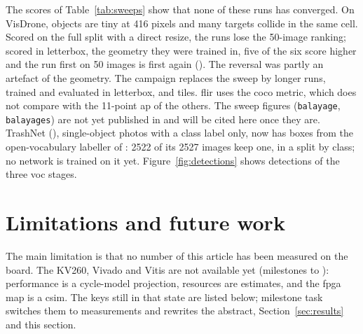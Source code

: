 \documentclass[11pt,a4paper]{article}
\begin{document}
The scores of Table~\ref{tab:sweeps} show that none of these runs has converged. On
VisDrone, objects are tiny at 416 pixels and many targets collide in the same cell. Scored
on the full split with a direct resize, the runs lose the 50-image ranking; scored in
\gls{letterbox}, the geometry they were trained in, five of the six score higher and the run
first on 50 images is first again (). The reversal was partly an artefact of the
geometry. The  campaign replaces the sweep by longer runs, trained and evaluated in
\gls{letterbox}, and \glspl{tile}. \gls{flir} uses the
\gls{coco} metric, which does not compare with the 11-point \gls{ap} of the others. The sweep figures
(\texttt{balayage}, \texttt{balayages}) are not yet published in
 and will be cited here once they are.
TrashNet (), single-object photos with a class label only, now has boxes from the
open-vocabulary labeller of : 2522 of its 2527 images keep one, in a split by class;
no network is trained on it yet.
Figure~\ref{fig:detections} shows detections of the three \gls{voc} stages.


\section{Limitations and future work}\label{sec:limits}

The main limitation is that no number of this article has been measured on the board. The
KV260, Vivado and Vitis are not available yet (milestones  to ): performance is a
cycle-model projection, resources are estimates, and the \gls{fpga} \gls{map} is a \gls{csim}. The
keys still in that state are listed below; milestone task  switches them to
measurements and rewrites the abstract, Section~\ref{sec:results} and this section.

\articlestatuslist
\end{document}
